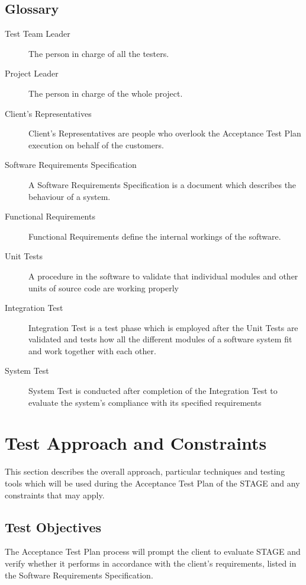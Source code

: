 \documentclass[titlepage]{article}
\begin{document}
\subsection{Glossary%
    \label{glossary}%
}
    \begin{description}
        \item[Test Team Leader]
            The person in charge of all the testers.
        \item[Project Leader]
            The person in charge of the whole project.
        \item[Client's Representatives]
            Client's Representatives are people who overlook the Acceptance Test Plan execution on behalf of the customers.
        \item[Software Requirements Specification]
            A Software Requirements Specification is a document which describes the behaviour of a system.
        \item[Functional Requirements]
            Functional Requirements define the internal workings of the software.
        \item[Unit Tests]
            A procedure in the software to validate that individual modules and other units of source code are working properly
        \item[Integration Test]
            Integration Test is a test phase which is employed after the Unit Tests are validated and tests how all the different modules of a software system fit and work together with each other.
        \item[System Test]
            System Test is conducted after completion of the Integration Test to evaluate the system's compliance with its specified requirements
    \end{description}


\section{Test Approach and Constraints%
    \label{approach}%
}
    This section describes the overall approach, particular techniques and testing tools which will be used during the Acceptance Test Plan of the STAGE and any constraints that may apply.


\subsection{Test Objectives%
    \label{objectives}%
}
    The Acceptance Test Plan process will prompt the client to evaluate STAGE and verify whether it performs in accordance with the client's requirements, listed in the Software Requirements Specification.
\end{document}
